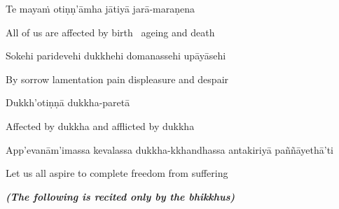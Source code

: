 \suttaRef{[MN 35]}

Te mayaṁ otiṇṇ'āmha jātiyā jarā-maraṇena

\begin{english}
  All of us are affected by birth \breathmark\ ageing and death\ifdigitalversion\makeatletter\hyperlink{endnote24-appendix}\makeatother\fi
\end{english}

Sokehi paridevehi dukkhehi domanassehi upāyāsehi

\begin{english}
  By sorrow lamentation pain displeasure\ifdigitalversion\makeatletter\hyperlink{endnote25-appendix}\makeatother\fi
  and despair\makeatletter\hyperlink{endnote26-appendix}\makeatother
\end{english}

Dukkh'otiṇṇā dukkha-paretā

\begin{english}
  Affected by dukkha and afflicted by dukkha\ifdigitalversion\makeatletter\hyperlink{endnote27-appendix}\makeatother\fi
\end{english}

\begin{pali-hang}
  App'evanām'imassa kevalassa dukkha-kkhandhassa antakiriyā paññāyethā'ti
\end{pali-hang}

\begin{english}
  Let us all aspire to complete freedom from suffering
\end{english}

\suttaRef{[SN 22.80]}

\clearpage

\begin{center}
  \textit{\textbf{(The following is recited only by the bhikkhus)}}
\end{center}

